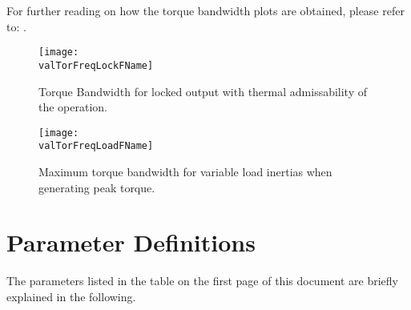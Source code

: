 \documentclass[a4paper,10pt]{cjtdsheet}      %
\begin{document}
\begin{multicols}{2}
For further reading on how the torque bandwidth plots are obtained, please refer to: \cite{Malzahn_2017}.

\end{multicols}


\begin{figure}%
		\texttt{[image: \\valTorFreqLockFName]}
		\caption{Torque Bandwidth for locked output with thermal admissability of the operation.}
	\label{fig:TorqueBandwidthLocked}
\end{figure}



\begin{figure}%
		\texttt{[image: \\valTorFreqLoadFName]}
		\caption{Maximum torque bandwidth for variable load inertias when generating peak torque.}
	\label{fig:TorqueBandwidthLoad}
\end{figure}

\section*{Parameter Definitions}
The parameters listed in the table on the first page of this document are briefly explained in the following.
\end{document}
